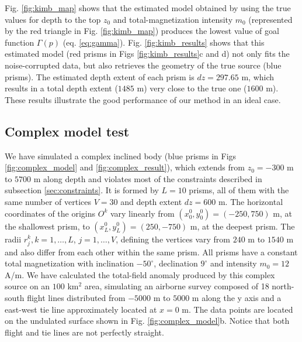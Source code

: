 Fig. \ref{fig:kimb_map} shows that the estimated model obtained by using the true values for depth to the top $ z_0 $ and total-magnetization intensity $ m_0 $ (represented by the red triangle in Fig. \ref{fig:kimb_map}) produces the lowest value of goal function  $ \Gamma(p) $ (eq. \ref{eq:gamma}). Fig. \ref{fig:kimb_results} shows that this estimated model (red prisms in Figs \ref{fig:kimb_results}c and d) not only fits the noise-corrupted data, but also retrieves the geometry of the true source (blue prisms). The estimated depth extent of each prism is $ dz = 297.65 $ m, which results in a total depth extent ($ 1485$ m) very close to the true one ($ 1600 $ m). These results illustrate the good performance of our method in an ideal case.

\subsection{Complex model test}

We have simulated a complex inclined body (blue prisms in Figs \ref{fig:complex_model} and \ref{fig:complex_result}), which extends from $z_0=-300$ m to $5700$ m along depth and violates most of the constraints described in subsection \ref{sec:constraints}. It is formed by $ L = 10 $ prisms, all of them with the same number of vertices $ V = 30 $ and depth extent $ dz = 600 $ m. The horizontal coordinates of the origins $ O^k $ vary linearly from $ (x_0^0, y_0^0) = (-250, 750) $ m, at the shallowest prism, to $ (x_L^0, y_L^0) = (250, -750) $ m, at the deepest prism. The radii $ r^k_j, k = 1, \dots, L$, $j = 1,\dots, V$, defining the vertices vary from $ 240 $ m to $ 1540 $ m and also differ from each other within the same prism. All prisms have a constant total magnetization with inclination $ -50^\circ $, declination $ 9^\circ $ and intensity $ m_0 = 12 $ A/m. We have calculated the total-field anomaly produced by this complex source on an $ 100 $ km$^2 $ area, simulating an airborne survey composed of 18 north-south flight lines distributed from $ -5000 $ m to $ 5000 $ m along the y axis and a east-west tie line approximately located at $ x = 0 $ m. The data points are located on the undulated surface shown in Fig. \ref{fig:complex_model}b. Notice that both flight and tie lines are not perfectly straight.

